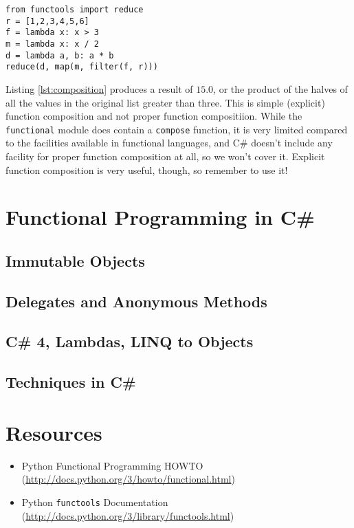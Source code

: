 \documentclass[ignorenonframetext,red]{beamer}
\begin{document}
\begin{frame}[fragile]
\begin{lstlisting}[style=python,caption={Function Composition},label={lst:composition}]
from functools import reduce
r = [1,2,3,4,5,6]
f = lambda x: x > 3
m = lambda x: x / 2
d = lambda a, b: a * b
reduce(d, map(m, filter(f, r)))
\end{lstlisting}
\end{frame}

\noindent Listing \ref{lst:composition} produces a result of $15.0$, or the product of the halves of all the values in the original list greater than three. This is simple (explicit) function composition and not proper function compositiion. While the \texttt{functional} module does contain a \texttt{compose} function, it is very limited compared to the facilities available in functional languages, and C\# doesn't include any facility for proper function composition at all, so we won't cover it. Explicit function composition is very useful, though, so remember to use it!

\section{Functional Programming in C\#}
\subsection{Immutable Objects}
\subsection{Delegates and Anonymous Methods}
\subsection{C\# 4, Lambdas, LINQ to Objects}
\subsection{Techniques in C\#}

\section*{Resources}
\begin{frame}
\begin{itemize}
	\item Python Functional Programming HOWTO\\(\url{http://docs.python.org/3/howto/functional.html})
	\item Python {\tt functools} Documentation\\(\url{http://docs.python.org/3/library/functools.html})
\end{itemize}
\end{frame}
\end{document}

